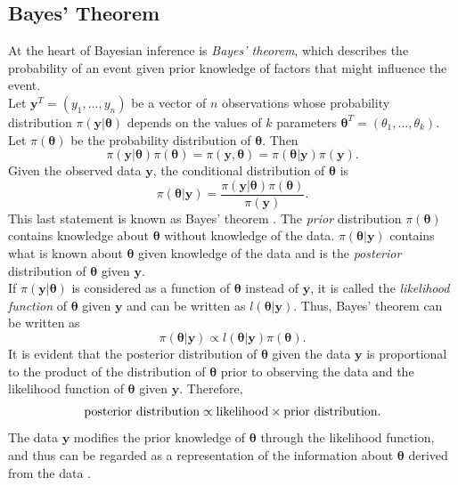 \subsection{Bayes' Theorem}\label{sec:bayes_theorem}
At the heart of Bayesian inference is \textit{Bayes' theorem}, which describes the probability of an event given prior knowledge of factors that might influence the event. \\
Let $\pmb{y}^T=\left(y_1,...,y_n\right)$ be a vector of $n$ observations whose probability distribution $\pi\left(\pmb{y}|\pmb{\theta}\right)$ depends on the values of $k$ parameters $\pmb{\theta}^T=\left(\theta_1,...,\theta_k\right)$. Let $\pi\left(\pmb{\theta}\right)$ be the probability distribution of $\pmb{\pmb{\theta}}$. Then 
\begin{equation}
    \pi\left(\pmb{y}|\pmb{\theta}\right)\pi\left(\pmb{\theta}\right)=\pi\left(\pmb{y},\pmb{\theta}\right) = \pi\left(\pmb{\theta}|\pmb{y}\right)\pi\left(\pmb{y}\right).
\end{equation}
Given the observed data $\pmb{y}$, the conditional distribution of $\pmb{\theta}$ is
\begin{equation}
    \pi\left(\pmb{\theta}|\pmb{y}\right)=\frac{\pi\left(\pmb{y}|\pmb{\theta}\right)\pi\left(\pmb{\theta}\right)}{\pi\left(\pmb{y}\right)}.
\end{equation}
This last statement is known as Bayes' theorem \autocite[][]{bayes1763lii}. The \textit{prior} distribution $\pi\left(\pmb{\theta}\right)$ contains knowledge about $\pmb{\theta}$ without knowledge of the data. $\pi\left(\pmb{\theta}|\pmb{y}\right)$ contains what is known about $\pmb{\theta}$ given knowledge of the data and is the \textit{posterior} distribution of $\pmb{\theta}$ given $\pmb{y}$. \\
If $\pi\left(\pmb{y}|\pmb{\theta}\right)$ is considered as a function of $\pmb{\theta}$ instead of $\pmb{y}$, it is called the \textit{likelihood function} of $\pmb{\theta}$ given $\pmb{y}$ and can be written as $l\left(\pmb{\theta}|\pmb{y}\right)$. Thus, Bayes' theorem can be written as
\begin{equation}
    \pi\left(\pmb{\theta}|\pmb{y}\right)\propto l\left(\pmb{\theta}|\pmb{y}\right)\pi\left(\pmb{\theta}\right).
\end{equation}
It is evident that the posterior distribution of $\pmb{\theta}$ given the data $\pmb{y}$ is proportional to the product of the distribution of $\pmb{\theta}$ prior to observing the data and the likelihood function of $\pmb{\theta}$ given $\pmb{y}$. Therefore,
\begin{equation*}
    \hbox{posterior distribution} \propto  \hbox{likelihood}\times\hbox{prior distribution}.
\end{equation*} \clearpage
The data $\pmb{y}$ modifies the prior knowledge of $\pmb{\theta}$ through the likelihood function, and thus can be regarded as a representation of the information about $\pmb{\theta}$ derived from the data \autocite[][]{box2011bayesian}.
